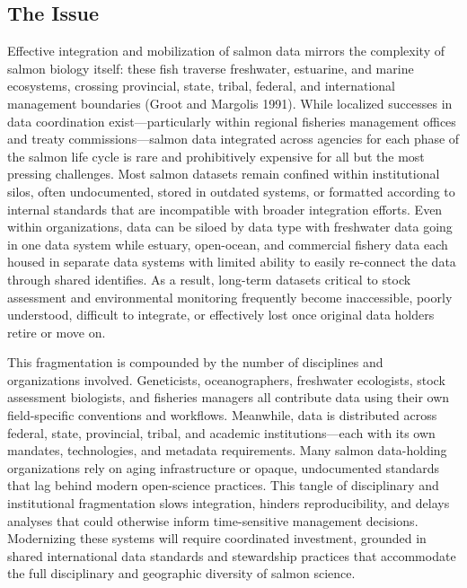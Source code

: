 \documentclass[
  letterpaper,
  DIV=11,
  numbers=noendperiod]{scrartcl}
\begin{document}
\subsection{The Issue}\label{the-issue}

Effective integration and mobilization of salmon data mirrors the
complexity of salmon biology itself: these fish traverse freshwater,
estuarine, and marine ecosystems, crossing provincial, state, tribal,
federal, and international management boundaries (Groot and Margolis
1991). While localized successes in data coordination
exist---particularly within regional fisheries management offices and
treaty commissions---salmon data integrated across agencies for each
phase of the salmon life cycle is rare and prohibitively expensive for
all but the most pressing challenges. Most salmon datasets remain
confined within institutional silos, often undocumented, stored in
outdated systems, or formatted according to internal standards that are
incompatible with broader integration efforts. Even within
organizations, data can be siloed by data type with freshwater data
going in one data system while estuary, open-ocean, and commercial
fishery data each housed in separate data systems with limited ability
to easily re-connect the data through shared identifies. As a result,
long-term datasets critical to stock assessment and environmental
monitoring frequently become inaccessible, poorly understood, difficult
to integrate, or effectively lost once original data holders retire or
move on.

This fragmentation is compounded by the number of disciplines and
organizations involved. Geneticists, oceanographers, freshwater
ecologists, stock assessment biologists, and fisheries managers all
contribute data using their own field-specific conventions and
workflows. Meanwhile, data is distributed across federal, state,
provincial, tribal, and academic institutions---each with its own
mandates, technologies, and metadata requirements. Many salmon
data-holding organizations rely on aging infrastructure or opaque,
undocumented standards that lag behind modern open-science practices.
This tangle of disciplinary and institutional fragmentation slows
integration, hinders reproducibility, and delays analyses that could
otherwise inform time-sensitive management decisions. Modernizing these
systems will require coordinated investment, grounded in shared
international data standards and stewardship practices that accommodate
the full disciplinary and geographic diversity of salmon science.
\end{document}
